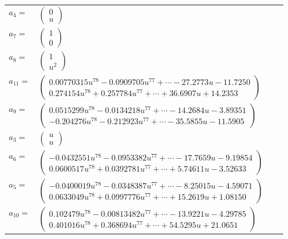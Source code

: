 \documentclass[1p]{elsarticle_modified}
\theoremstyle{definition}
\begin{document}
\begin{tabular}{m{7pt} m{180pt} m{7pt} m{180pt} }
\flushright $a_{4}=$&$\begin{pmatrix}0\\u\end{pmatrix}$ \\
\flushright $a_{7}=$&$\begin{pmatrix}1\\0\end{pmatrix}$ \\
\flushright $a_{8}=$&$\begin{pmatrix}1\\u^2\end{pmatrix}$ \\
\flushright $a_{11}=$&$\begin{pmatrix}0.00770315 u^{78}-0.0909705 u^{77}+\cdots-27.2773 u-11.7250\\0.274154 u^{78}+0.257784 u^{77}+\cdots+36.6907 u+14.2353\end{pmatrix}$ \\
\flushright $a_{9}=$&$\begin{pmatrix}0.0515299 u^{78}-0.0134218 u^{77}+\cdots-14.2684 u-3.89351\\-0.204276 u^{78}-0.212923 u^{77}+\cdots-35.5855 u-11.5905\end{pmatrix}$ \\
\flushright $a_{3}=$&$\begin{pmatrix}u\\u\end{pmatrix}$ \\
\flushright $a_{6}=$&$\begin{pmatrix}-0.0432551 u^{78}-0.0953382 u^{77}+\cdots-17.7659 u-9.19854\\0.0600517 u^{78}+0.0392781 u^{77}+\cdots+5.74611 u-3.52633\end{pmatrix}$ \\
\flushright $a_{5}=$&$\begin{pmatrix}-0.0400019 u^{78}-0.0348387 u^{77}+\cdots-8.25015 u-4.59071\\0.0633049 u^{78}+0.0997776 u^{77}+\cdots+15.2619 u+1.08150\end{pmatrix}$ \\
\flushright $a_{10}=$&$\begin{pmatrix}0.102479 u^{78}-0.00813482 u^{77}+\cdots-13.9221 u-4.29785\\0.401016 u^{78}+0.368694 u^{77}+\cdots+54.5295 u+21.0651\end{pmatrix}$ \\

\end{tabular}
\end{document}
